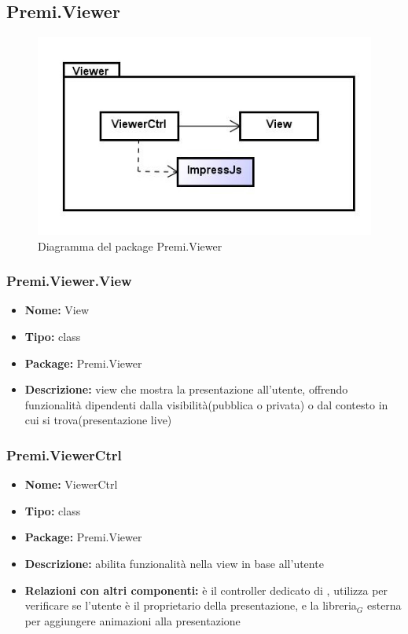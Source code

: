 \clearpage
\subsection{Premi.Viewer}
\begin{figure}[h]
\begin{center}
\includegraphics[scale=0.45]{img/diapkg/viewer-class.jpg}
\caption{Diagramma del package Premi.Viewer}
\end{center}
\end{figure}

\subsubsection{Premi.Viewer.View}
\begin{itemize}
  \item \textbf{Nome:} View
  \item \textbf{Tipo:} class
  \item \textbf{Package:} Premi.Viewer
  \item \textbf{Descrizione:} view che mostra la presentazione all'utente, offrendo funzionalità dipendenti dalla visibilità(pubblica o privata) o dal contesto in cui si trova(presentazione live) 
\end{itemize}
\subsubsection{Premi.ViewerCtrl}
\begin{itemize}
  \item \textbf{Nome:} ViewerCtrl
  \item \textbf{Tipo:} class
  \item \textbf{Package:} Premi.Viewer
  \item \textbf{Descrizione:} abilita funzionalità nella view in base all'utente
  \item \textbf{Relazioni con altri componenti:} è il controller dedicato di , utilizza   per verificare se l'utente è il proprietario della presentazione, e la libreria$_G$ esterna  per aggiungere animazioni alla presentazione
\end{itemize}




